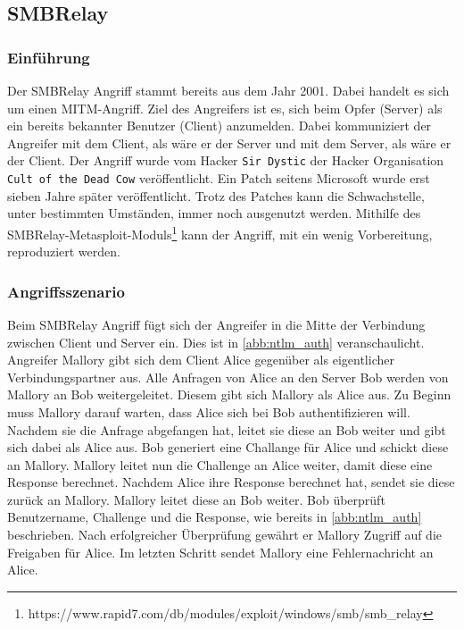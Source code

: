 \documentclass{AIFB_ITI_Crypto_Seminar}
\begin{document}
\subsection{SMBRelay}
\subsubsection{Einführung}
Der SMBRelay Angriff stammt bereits aus dem Jahr 2001. Dabei handelt es sich um einen MITM-Angriff. Ziel des Angreifers ist es, sich beim Opfer (Server) als ein bereits bekannter Benutzer (Client) anzumelden. Dabei kommuniziert der Angreifer mit dem Client, als wäre er der Server und mit dem Server, als wäre er der Client. Der Angriff wurde vom Hacker \texttt{Sir Dystic} der Hacker Organisation \texttt{Cult of the Dead Cow} veröffentlicht. Ein Patch seitens Microsoft wurde erst sieben Jahre später veröffentlicht. Trotz des Patches kann die Schwachstelle, unter bestimmten Umständen, immer noch ausgenutzt werden. Mithilfe des SMBRelay-Metasploit-Moduls\footnote{https://www.rapid7.com/db/modules/exploit/windows/smb/smb\_relay} kann der Angriff, mit ein wenig Vorbereitung, reproduziert werden.


\subsubsection{Angriffsszenario}
Beim SMBRelay Angriff fügt sich der Angreifer in die Mitte der Verbindung zwischen Client und Server ein. Dies ist in \autoref{abb:ntlm_auth} veranschaulicht. Angreifer Mallory gibt sich dem Client Alice gegenüber als eigentlicher Verbindungspartner aus. Alle Anfragen von Alice an den Server Bob werden von Mallory an Bob weitergeleitet. Diesem gibt sich Mallory als Alice aus. Zu Beginn muss Mallory darauf warten, dass Alice sich bei Bob authentifizieren will. Nachdem sie die Anfrage abgefangen hat, leitet sie diese an Bob weiter und gibt sich dabei als Alice aus. Bob generiert eine Challange für Alice und schickt diese an Mallory. Mallory leitet nun die Challenge an Alice weiter, damit diese eine Response berechnet. Nachdem Alice ihre Response berechnet hat, sendet sie diese zurück an Mallory. Mallory leitet diese an Bob weiter. Bob überprüft Benutzername, Challenge und die Response, wie bereits in \autoref{abb:ntlm_auth} beschrieben. Nach erfolgreicher Überprüfung gewährt er Mallory Zugriff auf die Freigaben für Alice. Im letzten Schritt sendet Mallory eine Fehlernachricht an Alice.
\end{document}
